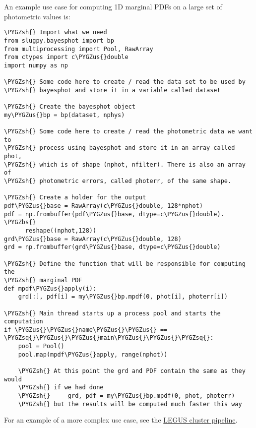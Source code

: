 \documentclass[letterpaper,10pt,english]{sphinxmanual}
\def\PYGZbs{\char`\\}
\def\PYGZus{\char`\_}
\def\PYGZsh{\char`\#}
\def\PYGZsq{\char`\'}
\renewcommand\PYGZsq{\textquotesingle}
\begin{document}
An example use case for computing 1D marginal PDFs on a large set of photometric values is:

\begin{Verbatim}[commandchars=\\\{\}]
\PYGZsh{} Import what we need
from slugpy.bayesphot import bp
from multiprocessing import Pool, RawArray
from ctypes import c\PYGZus{}double
import numpy as np

\PYGZsh{} Some code here to create / read the data set to be used by
\PYGZsh{} bayesphot and store it in a variable called dataset

\PYGZsh{} Create the bayesphot object
my\PYGZus{}bp = bp(dataset, nphys)

\PYGZsh{} Some code here to create / read the photometric data we want to
\PYGZsh{} process using bayesphot and store it in an array called phot,
\PYGZsh{} which is of shape (nphot, nfilter). There is also an array of
\PYGZsh{} photometric errors, called photerr, of the same shape.

\PYGZsh{} Create a holder for the output
pdf\PYGZus{}base = RawArray(c\PYGZus{}double, 128*nphot)
pdf = np.frombuffer(pdf\PYGZus{}base, dtype=c\PYGZus{}double). \PYGZbs{}
      reshape((nphot,128))
grd\PYGZus{}base = RawArray(c\PYGZus{}double, 128)
grd = np.frombuffer(grd\PYGZus{}base, dtype=c\PYGZus{}double)

\PYGZsh{} Define the function that will be responsible for computing the
\PYGZsh{} marginal PDF
def mpdf\PYGZus{}apply(i):
    grd[:], pdf[i] = my\PYGZus{}bp.mpdf(0, phot[i], photerr[i])

\PYGZsh{} Main thread starts up a process pool and starts the computation
if \PYGZus{}\PYGZus{}name\PYGZus{}\PYGZus{} == \PYGZsq{}\PYGZus{}\PYGZus{}main\PYGZus{}\PYGZus{}\PYGZsq{}:
    pool = Pool()
    pool.map(mpdf\PYGZus{}apply, range(nphot))

    \PYGZsh{} At this point the grd and PDF contain the same as they would
    \PYGZsh{} if we had done
    \PYGZsh{}     grd, pdf = my\PYGZus{}bp.mpdf(0, phot, photerr)
    \PYGZsh{} but the results will be computed much faster this way
\end{Verbatim}

For an example of a more complex use case, see the \href{https://bitbucket.org/krumholz/legus-cluster-pipeline/overview}{LEGUS cluster pipeline}.
\end{document}
